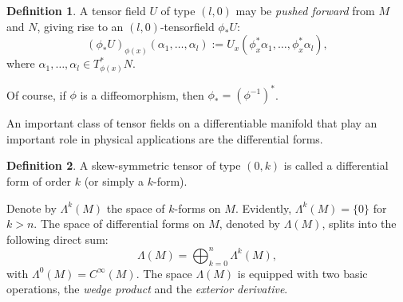 \documentclass[a4paper]{article}
\theoremstyle{definition}
\newtheorem{defn}{Definition}
\theoremstyle{plain}
\begin{document}
    \begin{defn}
        A tensor field $U$ of type $(l,0)$ may be
        \textit{pushed forward} from $M$ and $N$, giving
        rise to an $(l,0)$-tensorfield $\phi_*U:$
         \begin{equation}
             (\phi_*U)_{\phi(x)}(\alpha_1,\ldots,\alpha_l)
             :=
             U_x(\phi^{*}_x\alpha_1,\ldots,\phi^{*}_x\alpha_l),
        \end{equation}
        where $\alpha_1,\ldots,\alpha_l \in
        T_{\phi(x)}^{*}N$.
    \end{defn}

    Of course, if $\phi$ is a diffeomorphism, then $\phi_* =
    (\phi^{-1})^{*}$.

    An important class of tensor fields on a differentiable
    manifold that play an important role in physical
    applications are the differential forms.

    \begin{defn}
        A skew-symmetric tensor of type $(0,k)$ is called a
        differential form of order $k$ (or simply a
        $k$-form).
    \end{defn}

    Denote by $\Lambda^{k}(M)$ the space of $k$-forms on
    $M$. Evidently, $\Lambda^{k}(M) = \{0\}$ for $k > n$.
    The space of differential forms on $M$, denoted by
    $\Lambda(M)$, splits into the following direct sum:
    \begin{equation}
        \Lambda(M)
        = \bigoplus_{k=0}^{n} \Lambda^{k}(M),
    \end{equation}
    with $\Lambda^{0}(M) = C^{\infty}(M)$. The space
    $\Lambda(M)$ is equipped with two basic operations, the
    \textit{wedge product} and the \textit{exterior
    derivative}.
\end{document}
